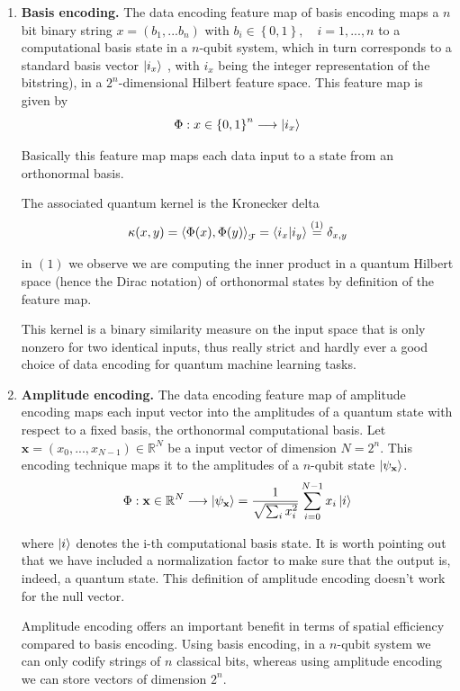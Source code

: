 \begin{enumerate}
    \item \textbf{Basis encoding.} The data encoding feature map of basis encoding maps a $n$ bit binary string $x = (b_1,...b_n) $ with $b_i \in \left\lbrace 0,1\right\rbrace, \quad i=1,...,n$ to a computational basis state in a $n$-qubit system, which in turn corresponds to a standard basis vector $ \ket{i_x}$ , with $i_x$ being the integer representation of the bitstring), in a $2^n$-dimensional Hilbert feature space. This feature map is given by $$\Phi: x \in \left\lbrace 0,1 \right\rbrace^n \longrightarrow \ket{i_x} $$

    Basically this feature map maps each data input to a state from an orthonormal basis.

    The associated quantum kernel is the Kronecker delta
    $$\kappa(x,y) = \left< \Phi(x), \Phi(y) \right>_{\mathcal{F}} = \braket{i_x|i_y} \stackrel{(1)}{=} \delta_{x,y}$$

    in $(1)$ we observe we are computing the inner product in a quantum Hilbert space (hence the Dirac notation)  of orthonormal states by definition of the feature map. 
    
    This kernel is a binary similarity measure on the input space that is only nonzero for two identical inputs, thus really strict and hardly ever a good choice of data encoding for quantum machine learning tasks.
    
    \item \textbf{Amplitude encoding. } The data encoding feature map of amplitude encoding maps each input vector into the amplitudes of a quantum state with respect to a fixed basis, the orthonormal computational basis. Let $\mathbf{x}=(x_0,...,x_{N-1} ) \in \mathbb{R}^N $ be a input vector of dimension $N=2^n$. This encoding technique maps it to the amplitudes of a $n$-qubit state $\ket{\psi_{\mathbf{x}}}$.
    \begin{equation*}
        \Phi: \mathbf{x}\in \mathbb{R}^N \longrightarrow \ket{\psi_{\mathbf{x}}} = \frac{1}{\sqrt{\sum_{i}x_i^2}} \sum_{i=0}^{N-1} x_i \ket{i}
    \end{equation*}

    where $\ket{i}$ denotes the i-th computational basis state. 
    It is worth pointing out that we have included a normalization factor to make sure that the output is, indeed, a quantum state. This definition of amplitude encoding doesn't work for the null vector.
    
    Amplitude encoding offers an important benefit in terms of spatial efficiency compared to basis encoding. Using basis encoding, in a $n$-qubit system we can only codify strings of $n$ classical bits, whereas using amplitude encoding we can store vectors of dimension $2^n$. 


\end{enumerate}
